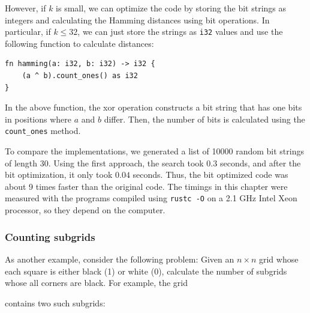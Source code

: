 However, if $k$ is small, we can optimize the code
by storing the bit strings as integers and
calculating the Hamming distances using bit operations.
In particular, if $k \le 32$, we can just store
the strings as \texttt{i32} values and use the
following function to calculate distances:
\begin{lstlisting}
fn hamming(a: i32, b: i32) -> i32 {
    (a ^ b).count_ones() as i32
}
\end{lstlisting}
In the above function, the xor operation constructs
a bit string that has one bits in positions
where $a$ and $b$ differ.
Then, the number of bits is calculated using
the \texttt{count\_ones} method.

To compare the implementations, we generated
a list of 10000 random bit strings of length 30.
Using the first approach, the search took
$0.3$ seconds, and after the bit optimization,
it only took $0.04$ seconds.
Thus, the bit optimized code was about
9 times faster than the original code.
The timings in this chapter were measured
with the programs compiled using \texttt{rustc -O}
on a 2.1 GHz Intel Xeon processor,
so they depend on the computer.

\subsubsection{Counting subgrids}

As another example, consider the
following problem:
Given an $n \times n$ grid whose
each square is either black (1) or white (0),
calculate the number of subgrids
whose all corners are black.
For example, the grid
\begin{center}
\end{center}
contains two such subgrids:
\begin{center}
\end{center}

